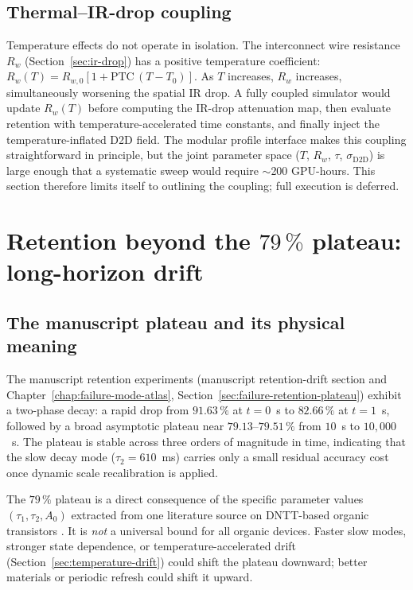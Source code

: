 \subsection{Thermal--IR-drop coupling}

Temperature effects do not operate in isolation.  The interconnect wire resistance $R_{w}$ (Section~\ref{sec:ir-drop}) has a positive temperature coefficient: $R_{w}(T) = R_{w,0}[1 + \text{PTC}\,(T-T_{0})]$.  As $T$ increases, $R_{w}$ increases, simultaneously worsening the spatial IR drop.  A fully coupled simulator would update $R_{w}(T)$ before computing the IR-drop attenuation map, then evaluate retention with temperature-accelerated time constants, and finally inject the temperature-inflated D2D field.  The modular profile interface makes this coupling straightforward in principle, but the joint parameter space ($T$, $R_{w}$, $\tau$, $\sigma_{\text{D2D}}$) is large enough that a systematic sweep would require $\sim$200 GPU-hours.  This section therefore limits itself to outlining the coupling; full execution is deferred.


\section{Retention beyond the $79\,\%$ plateau: long-horizon drift}
\label{sec:retention-beyond}

\subsection{The manuscript plateau and its physical meaning}

The manuscript retention experiments (manuscript retention-drift section and Chapter~\ref{chap:failure-mode-atlas}, Section~\ref{sec:failure-retention-plateau}) exhibit a two-phase decay: a rapid drop from $91.63\,\%$ at $t=0$~s to $82.66\,\%$ at $t=1$~s, followed by a broad asymptotic plateau near $79.13$--$79.51\,\%$ from $10$~s to $10{,}000$~s.  The plateau is stable across three orders of magnitude in time, indicating that the slow decay mode ($\tau_{2}=610$~ms) carries only a small residual accuracy cost once dynamic scale recalibration is applied.

The $79\,\%$ plateau is a direct consequence of the specific parameter values $(\tau_{1}, \tau_{2}, A_{0})$ extracted from one literature source on DNTT-based organic transistors \citep{vincze2026dualplasticity}.  It is \emph{not} a universal bound for all organic devices.  Faster slow modes, stronger state dependence, or temperature-accelerated drift (Section~\ref{sec:temperature-drift}) could shift the plateau downward; better materials or periodic refresh could shift it upward.

